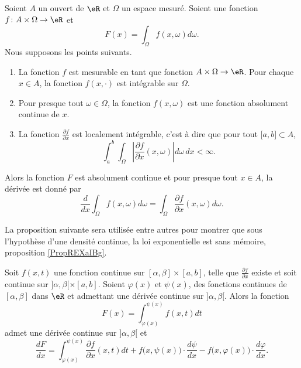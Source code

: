 \begin{theorem}     \label{ThoDerSousIntegrale}
    Soient \( A\) un ouvert de \( \eR\) et \( \Omega\) un espace mesuré. Soient une fonction \( f\colon A\times \Omega\to \eR\) et
    \begin{equation}
        F(x)=\int_{\Omega}f(x,\omega)d\omega.
    \end{equation}
    Nous supposons les points suivants.
    \begin{enumerate}
        \item
            La fonction \( f\) est mesurable en tant que fonction \( A\times\Omega\to \eR\). Pour chaque \( x\in A\), la fonction \( f(x,\cdot)\) est intégrable sur \( \Omega\).
        \item
            Pour presque tout \( \omega\in\Omega\), la fonction \( f(x,\omega)\) est une fonction absolument continue de \( x\).
        \item
            La fonction \( \frac{ \partial f }{ \partial x }\) est localement intégrable, c'est à dire que pour tout \( \mathopen[ a , b \mathclose]\subset A\),
            \begin{equation}
                \int_a^b\int_{\Omega}\left| \frac{ \partial f }{ \partial x }(x,\omega) \right| d\omega\,dx<\infty.
            \end{equation}
    \end{enumerate}
    Alors la fonction \( F\) est absolument continue et pour presque tout \( x\in A\), la dérivée est donné par
    \begin{equation}
        \frac{ d }{ dx }\int_{\Omega}f(x,\omega)d\omega=\int_{\Omega}\frac{ \partial f }{ \partial x }(x,\omega)d\omega.
    \end{equation}
\end{theorem}

La proposition suivante sera utilisée entre autres pour montrer que sous l'hypothèse d'une densité continue, la loi exponentielle est sans mémoire, proposition \ref{PropREXaIBg}.
\begin{proposition}		\label{PropDerrFnAvecBornesFonctions}
Soit $f(x,t)$ une fonction continue sur $[\alpha,\beta]\times[a,b]$, telle que $\frac{ \partial f }{ \partial x }$ existe et soit continue sur $]\alpha,\beta[\times[a,b]$. Soient $\varphi(x)$ et $\psi(x)$, des fonctions continues de $[\alpha,\beta]$ dans $\eR$ et admettant une dérivée continue sur $]\alpha,\beta [$. Alors la fonction
\begin{equation}
	F(x)=\int_{\varphi(x)}^{\psi(x)}f(x,t)dt
\end{equation}
admet une dérivée continue sur $]\alpha,\beta[$ et
\begin{equation}	\label{EqFormDerrFnAvecBorneNInt}
	\frac{ dF }{ dx }=\int_{\varphi(x)}^{\psi(x)}\frac{ \partial f }{ \partial x }(x,t)dt+f\big( x,\psi(x) \big)\cdot\frac{ d\psi }{ dx }- f\big( x,\varphi(x) \big)\cdot\frac{ d\varphi }{ dx }.
\end{equation}
\end{proposition}


